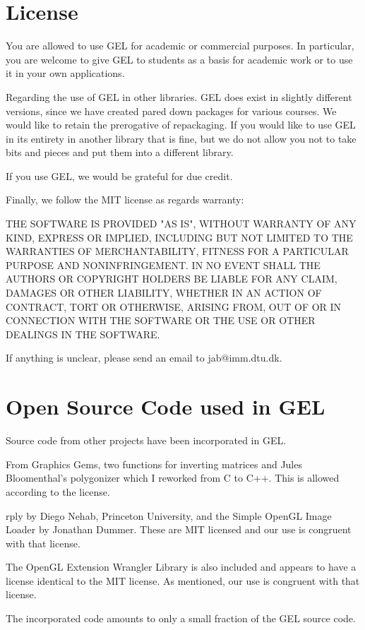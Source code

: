 \documentclass[a4paper]{article}
\begin{document}
\section{License}  
%
%
\begin{trivlist}
\item
You are allowed to use GEL for academic or commercial purposes. In particular, you are welcome to give GEL to students as a basis for academic work or to use it in your own applications.
\item
Regarding the use of GEL in other libraries. GEL does exist in slightly different versions, since we have created pared down packages for various courses. We would like to retain the prerogative of repackaging. If you would like to use GEL in its entirety in another library  that is fine, but we do not allow you not to take bits and pieces and put them into a different library.
\item
If you use GEL, we would be grateful for due credit.
\item
Finally, we follow the MIT license as regards warranty:
\item
THE SOFTWARE IS PROVIDED "AS IS", WITHOUT WARRANTY OF ANY KIND, EXPRESS OR IMPLIED, INCLUDING BUT NOT LIMITED TO THE WARRANTIES OF MERCHANTABILITY, FITNESS FOR A PARTICULAR PURPOSE AND NONINFRINGEMENT. IN NO EVENT SHALL THE AUTHORS OR COPYRIGHT HOLDERS BE LIABLE FOR ANY CLAIM, DAMAGES OR OTHER LIABILITY, WHETHER IN AN ACTION OF CONTRACT, TORT OR OTHERWISE, ARISING FROM, OUT OF OR IN CONNECTION WITH THE SOFTWARE OR THE USE OR OTHER DEALINGS IN THE SOFTWARE.
\item
If anything is unclear, please send an email to jab@imm.dtu.dk. 
\end{trivlist}
%
%
\section{Open Source Code used in GEL}  
%
%
Source code from other projects have been incorporated in GEL.
\begin{trivlist}
\item From Graphics Gems, two functions for inverting matrices and Jules Bloomenthal's polygonizer which I reworked from C to C++. This is allowed according to the license.
\item rply by Diego Nehab, Princeton University, and the Simple OpenGL Image Loader by Jonathan Dummer.  These are MIT licensed and our use is congruent with that license.
\item The OpenGL Extension Wrangler Library is also included and appears to have a license identical to the MIT license.	 As mentioned, our use is congruent with that license.
\end{trivlist}
The incorporated code amounts to only a small fraction of the GEL source code.
\end{document}
